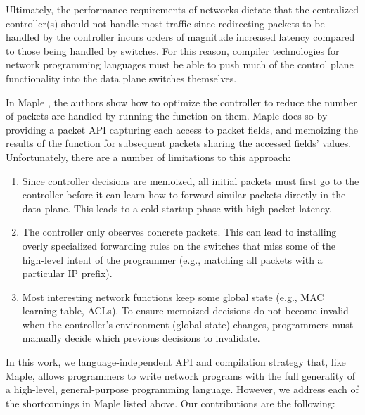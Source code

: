 \documentclass[preprint]{sigplanconf}
\begin{document}
Ultimately, the performance requirements of networks dictate that the centralized controller(s) should not handle most traffic since redirecting packets to be handled by the controller incurs orders of magnitude increased latency compared to those being handled by switches. For this reason, compiler technologies for network programming languages must be able to push much of the control plane functionality into the data plane switches themselves. 

In Maple \cite{Maple}, the authors show how to optimize the controller to reduce the number of packets are handled by running the function on them. Maple does so by providing a packet API capturing each access to packet fields, and memoizing the results of the function for subsequent packets sharing the accessed fields' values. Unfortunately, there are a number of limitations to this approach:


\begin{enumerate}
\item Since controller decisions are memoized, all initial packets must first go to the controller before it can learn how to forward similar packets directly in the data plane. This leads to a cold-startup phase with high packet latency.
\item The controller only observes concrete packets. This can lead to installing overly specialized forwarding rules on the switches that miss some of the high-level intent of the programmer (e.g., matching all packets with a particular IP prefix).
\item Most interesting network functions keep some global state (e.g., MAC learning table, ACLs). To ensure memoized decisions do not become invalid when the controller's environment (global state) changes, programmers must manually decide which previous decisions to invalidate.
\end{enumerate}


In this work, we language-independent API and compilation strategy that, like Maple, allows programmers to write network programs with the full generality of a high-level, general-purpose programming language.
However, we address each of the shortcomings in Maple listed above. Our contributions are the following:
\end{document}
